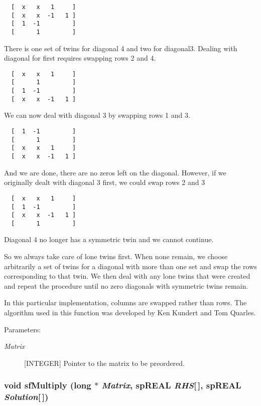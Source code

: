 \footnotesize\begin{verbatim}  [  x   x   1     ]
  [  x   x  -1   1 ]
  [  1  -1         ]
  [      1         ]
\end{verbatim}\normalsize 
 There is one set of twins for diagonal 4 and two for diagonal3. Dealing with diagonal for first requires swapping rows 2 and 4. 

\footnotesize\begin{verbatim}  [  x   x   1     ]
  [      1         ]
  [  1  -1         ]
  [  x   x  -1   1 ]
\end{verbatim}\normalsize 
 We can now deal with diagonal 3 by swapping rows 1 and 3. 

\footnotesize\begin{verbatim}  [  1  -1         ]
  [      1         ]
  [  x   x   1     ]
  [  x   x  -1   1 ]
\end{verbatim}\normalsize 
 And we are done, there are no zeros left on the diagonal. However, if we originally dealt with diagonal 3 first, we could swap rows 2 and 3 

\footnotesize\begin{verbatim}  [  x   x   1     ]
  [  1  -1         ]
  [  x   x  -1   1 ]
  [      1         ]
\end{verbatim}\normalsize 
 Diagonal 4 no longer has a symmetric twin and we cannot continue.

So we always take care of lone twins first. When none remain, we choose arbitrarily a set of twins for a diagonal with more than one set and swap the rows corresponding to that twin. We then deal with any lone twins that were created and repeat the procedure until no zero diagonals with symmetric twins remain.

In this particular implementation, columns are swapped rather than rows. The algorithm used in this function was developed by Ken Kundert and Tom Quarles.\begin{Desc}
\item[Parameters: ]\par
\begin{description}
\item[{\em 
Matrix}][INTEGER] Pointer to the matrix to be preordered. \end{description}
\end{Desc}
\subsubsection{\setlength{\rightskip}{0pt plus 5cm}void sf\-Multiply (long $\ast$ {\em Matrix}, sp\-REAL {\em RHS}[$\,$], sp\-REAL {\em Solution}[$\,$])}\label{spFortran_8c_a72}


